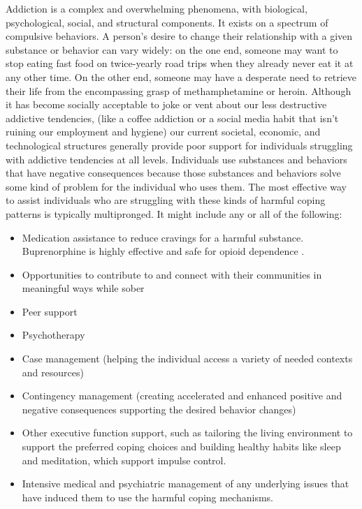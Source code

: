 \documentclass[12pt,letterpaper]{book}
\begin{document}
Addiction is a complex and overwhelming phenomena, with biological, psychological, social, and structural components. It exists on a spectrum of compulsive behaviors. A person's desire to change their relationship with a given substance or behavior can vary widely: on the one end, someone may want to stop eating fast food on twice-yearly road trips when they already never eat it at any other time. On the other end, someone may have a desperate need to retrieve their life from the encompassing grasp of methamphetamine or heroin. Although it has become socially acceptable to joke or vent about our less destructive addictive tendencies, (like a coffee addiction or a social media habit that isn't ruining our employment and hygiene) our current societal, economic, and technological structures generally provide poor support for individuals struggling with addictive tendencies at all levels. Individuals use substances and behaviors that have negative consequences because those substances and behaviors solve some kind of problem for the individual who uses them. The most effective way to assist individuals who are struggling with these kinds of harmful coping patterns is typically multipronged. It might include any or all of the following:

\begin{itemize}
    \item Medication assistance to reduce cravings for a harmful substance. Buprenorphine is highly effective and safe for opioid dependence \cite{Mattickbuprenorphine}.
    \item Opportunities to contribute to and connect with their communities in meaningful ways while sober
    \item Peer support
    \item Psychotherapy
    \item Case management (helping the individual access a variety of needed contexts and resources)
    \item Contingency management (creating accelerated and enhanced positive and negative consequences supporting the desired behavior changes)
    \item Other executive function support, such as tailoring the living environment to support the preferred coping choices and building healthy habits like sleep and meditation, which support impulse control.
    \item Intensive medical and psychiatric management of any underlying issues that have induced them to use the harmful coping mechanisms.
\end{itemize}
\end{document}
